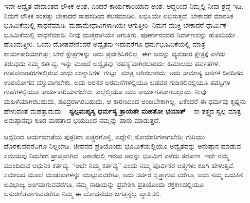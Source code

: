ಇದೇ ಅದ್ವೈತ ವೇದಾಂತದ ಲೌಕಿಕ ಅಂಶ, ಎಂದರೆ ಕಾರ್ಯಕಾರಿಯಾದ ಅಂಶ. ಆದ್ದರಿಂದ ನಿಮ್ಮಲ್ಲಿ ನೀವು ಶ್ರದ್ಧೆ ಇಡಿ. ನಿಮಗೆ ಲೌಕಿಕ ಸಂಪತ್ತು ಬೇಕಾದರೆ ಸಾಹಸದಿಂದ ಕೆಲಸಮಾಡಿರಿ. ಲಭಿಸಿಯೇ ಲಭಿಸುತ್ತದೆ. ಬೇಕಾದರೆ ಮಾನಸಿಕ ಭೂಮಿಕೆಯಲ್ಲಿ ಸಾಧನೆಮಾಡಿ; ಮಹಾಮೇಧಾವಿಗಳಾಗಿಯೇ ಆಗುತ್ತೀರಿ. ನಿಮಗೆ ಮುಕ್ತಿ ಬೇಕಾದರೆ ಧಾರ್ಮಿಕ ಭೂಮಿಕೆಯಲ್ಲಿ ಸಾಧನೆಮಾಡಿ; ನೀವು ಮುಕ್ತರಾಗಿಯೇ ಆಗುತ್ತೀರಿ. ಪೂರ್ಣಾನಂದದ ನಿರ್ವಾಣವನ್ನು ಹೊಂದಿಯೇ ಹೊಂದುತ್ತೀರಿ. ಒಂದು ದೋಷವೇನೆಂದರೆ ಅದ್ವೈತವು ಇದುವರೆಗೂ ಧರ್ಮಭೂಮಿಕೆಯಲ್ಲಿ ಮಾತ್ರ ಕಾರ್ಯಕಾರಿಯಾಗಿತ್ತು; ಬೇರೆ ಕ್ಷೇತ್ರಗಳನ್ನು ಅದು ಪ್ರವೇಶಿಸಿರಲಿಲ್ಲ. ಈಗ ಅದನ್ನು ವ್ಯವಹಾರ ಕ್ಷೇತ್ರಕ್ಕೆ ಎಳೆದು ತರುವುದು ನಮ್ಮ ಕರ್ತವ್ಯ. ಇನ್ನು ಮುಂದೆ ಅದ್ವೈತವು ‘ರಹಸ್ಯ’ವಾಗಿರಬಾರದು; ಹಿಮಾಲಯ ಪರ್ವತಗಳ, ಗುಹವನಾಂತರಗಳಲ್ಲಿರುವ ಸಾಧು ಸಂನ್ಯಾಸಿಗಳ ‘ಗುಟ್ಟು’ ಮಾತ್ರ ಆಗಿರಬಾರದು; ಅದು ಸಾಮಾನ್ಯ ಜನಗಳ ದಿನದಿನದ ಉಪಯೋಗದ ವಸ್ತುವಾಗಬೇಕು. ಅದು ಅರಸರ ಅರಮನೆಗಳಲ್ಲಿಯೂ ಬಡವರ ಗುಡಿಸಲಿನಲ್ಲಿಯೂ ತಪಸ್ವಿಗಳ ಗುಹೆಗಳಲ್ಲಿಯೂ ಕಾರ್ಯಕಾರಿಯಾಗಬೇಕು. ಎಲ್ಲೆಲ್ಲಿಯೂ ಅದು ಕಾರ್ಯಗತವಾಗಬಲ್ಲುದು. ನೀವು ಮಹಿಳೆಯಾಗಿರಬಹುದು, ಶೂದ್ರರಾಗಿರಬಹುದು, ಆ ಕಾರಣದಿಂದ ಅಂಜಬೇಕಾಗಿಲ್ಲ. ಏಕೆಂದರೆ ಈ ಧರ್ಮವು ಕೃಷ್ಣನು ಹೇಳುವಂತೆ ಮಹತ್ತಾದುದು – \textbf{ಸ್ವಲ್ಪಮಪ್ಯಸ್ಯ ಧರ್ಮಸ್ಯ ತ್ರಾಯತೇ ಮಹತೋ ಭಯಾತ್​} – ಈ ತತ್ತ್ವದ ಸ್ವಲ್ಪ ಮಾತ್ರ ಅನುಷ್ಠಾನವೂ ಕೂಡ ಮಹತ್ತಾದ ಭಯದಿಂದ ನಮ್ಮನ್ನು ಪಾರು ಮಾಡುತ್ತದೆ.

ಆದ್ದರಿಂದ ಆರ್ಯಮಾತೆಯ ಪುತ್ರರಿರಾ ಎಚ್ಚರಗೊಳ್ಳಿ, ಎದ್ದೇಳಿ; ಸೋಮಾರಿಗಳಾಗಬೇಡಿ; ಗುರಿಯು ದೊರಕುವವರೆವಿಗೂ ನಿಲ್ಲಬೇಡಿ. ಜೀವನದ ಪ್ರತಿಯೊಂದು ಭೂಮಿಕೆಯಲ್ಲಿಯೂ ಅದ್ವೈತವನ್ನು ಅನುಷ್ಠಾನ ಮಾಡುವ ಸಮಯವು ನಿಮಗೀಗ ಪ್ರಾಪ್ತವಾಗಿದೆ. ಆಕಾಶದಲ್ಲಿ ಇರುವ ಅದನ್ನು ಭೂಮಿಗೆ ಎಳೆದು ತರೋಣ. ಇದೇ ನಮ್ಮ ಮುಂದಿರುವ ಆಧುನಿಕ ಕರ್ತವ್ಯ. “ಅದೇ ನಿಮ್ಮ ಕರ್ತವ್ಯ” ಎಂದು ನಮ್ಮ ಪೂರ್ವಿಕರ ಆತ್ಮಗಳು ಕೂಗಿ ಹೇಳುತ್ತಿವೆ. ಸಮಾಜದ ಮೂಲೆ ಮುಡುಕುಗಳನ್ನು ಮುಟ್ಟುವವರೆಗೂ, ಅದು ಸರ್ವರ ಸ್ವತ್ತಾಗುವ ವರೆಗೂ, ಅದು ನಮ್ಮ ಬದುಕಿನ ಅವಿಭಾಜ್ಯ ಅಂಗವಾಗುವವರೆಗೂ, ನಮ್ಮ ನಾಡಿಯನ್ನು ಪ್ರವೇಶಿಸಿ ಪ್ರತಿಯೊಂದು ರಕ್ತಕಣದಲ್ಲಿಯೂ ಅನುರಣಿತವಾಗುವವರೆಗೂ ನಿಮ್ಮ ಈ ಬೋಧನೆಯು ಜಗತ್ತನ್ನೆಲ್ಲ ವ್ಯಾಪಿಸಲಿ.

\vskip 2pt

